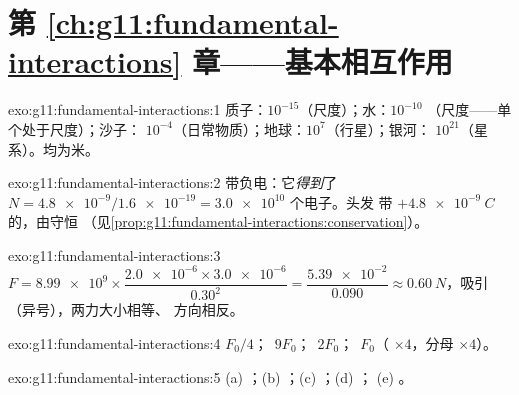 \section*{第 \ref{ch:g11:fundamental-interactions} 章——基本相互作用}

\begin{solution}{exo:g11:fundamental-interactions:1}
质子：$10^{-15}$（尺度）；水：$10^{-10}$
（尺度——单个处于尺度）；沙子：
$10^{-4}$（日常物质）；地球：$10^{7}$（行星）；银河：
$10^{21}$（星系）。均为米。
\end{solution}

\begin{solution}{exo:g11:fundamental-interactions:2}
带负电：它\emph{得到}了
$N = \num{4.8e-9}/\num{1.6e-19} = \num{3.0e10}$ 个电子。头发
带 $+\qty{4.8e-9}{C}$ 的，由守恒
（见\cref{prop:g11:fundamental-interactions:conservation}）。
\end{solution}

\begin{solution}{exo:g11:fundamental-interactions:3}
$F = \num{8.99e9} \times \dfrac{\num{2.0e-6} \times \num{3.0e-6}}{0.30^2}
= \dfrac{\num{5.39e-2}}{0.090} \approx \qty{0.60}{N}$，吸引
（异号），两力大小相等、
方向相反。
\end{solution}

\begin{solution}{exo:g11:fundamental-interactions:4}
$F_0/4$；\ $9F_0$；\ $2F_0$；\ $F_0$（ $\times 4$，分母
$\times 4$）。
\end{solution}

\begin{solution}{exo:g11:fundamental-interactions:5}
(a) ；(b) ；(c) ；(d) ；
(e) 。
\end{solution}

